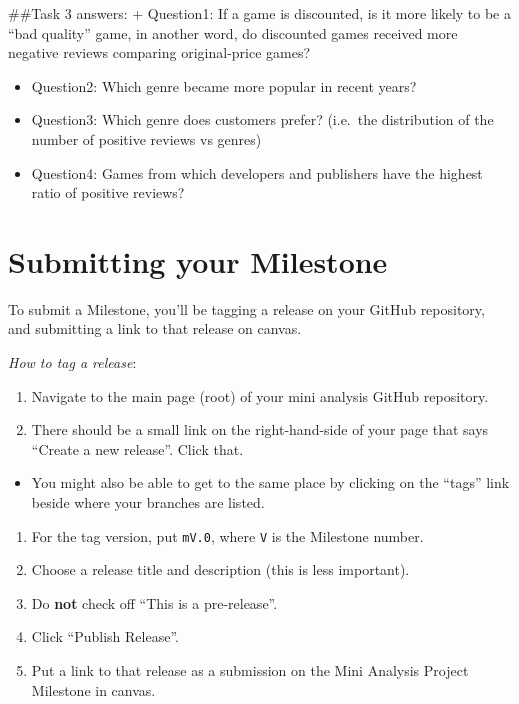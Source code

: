 \documentclass[
]{article}
\providecommand{\tightlist}{%
  \setlength{\itemsep}{0pt}\setlength{\parskip}{0pt}}
\begin{document}
\#\#Task 3 answers: + Question1: If a game is discounted, is it more
likely to be a ``bad quality'' game, in another word, do discounted
games received more negative reviews comparing original-price games?

\begin{itemize}
\item
  Question2: Which genre became more popular in recent years?
\item
  Question3: Which genre does customers prefer? (i.e.~the distribution
  of the number of positive reviews vs genres)
\item
  Question4: Games from which developers and publishers have the highest
  ratio of positive reviews?
\end{itemize}

\hypertarget{submitting-your-milestone}{%
\section{Submitting your Milestone}\label{submitting-your-milestone}}

To submit a Milestone, you'll be tagging a release on your GitHub
repository, and submitting a link to that release on canvas.

\emph{How to tag a release}:

\begin{enumerate}
\def\labelenumi{\arabic{enumi}.}
\tightlist
\item
  Navigate to the main page (root) of your mini analysis GitHub
  repository.
\item
  There should be a small link on the right-hand-side of your page that
  says ``Create a new release''. Click that.
\end{enumerate}

\begin{itemize}
\tightlist
\item
  You might also be able to get to the same place by clicking on the
  ``tags'' link beside where your branches are listed.
\end{itemize}

\begin{enumerate}
\def\labelenumi{\arabic{enumi}.}
\setcounter{enumi}{2}
\tightlist
\item
  For the tag version, put \texttt{mV.0}, where \texttt{V} is the
  Milestone number.
\item
  Choose a release title and description (this is less important).
\item
  Do \textbf{not} check off ``This is a pre-release''.
\item
  Click ``Publish Release''.
\item
  Put a link to that release as a submission on the Mini Analysis
  Project Milestone in canvas.
\end{enumerate}
\end{document}
